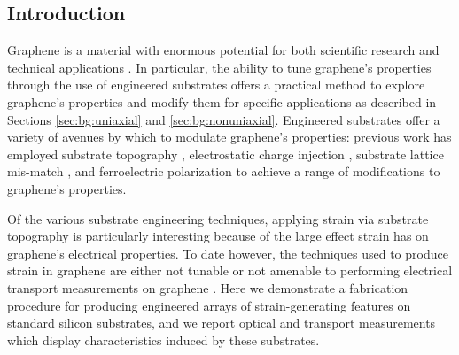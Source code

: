 \documentclass[edeposit,fullpage,draftthesis]{uiucthesis2009}
\begin{document}
            
    \subsection{Introduction}
    
            Graphene is a material with enormous potential for both scientific research and technical applications
            \cite{novoselov2004electric,novoselov2005two,zhang2005experimental,geim2007rise}.
            In particular, the ability to tune graphene's properties through the use of engineered substrates offers a practical
            method to explore graphene's properties and modify them for specific applications 
            \cite{guinea2010energy, zhou2007substrate} as described in Sections \ref{sec:bg:uniaxial} and \ref{sec:bg:nonuniaxial}.
            Engineered substrates offer a variety of avenues by which to modulate graphene's properties:
            previous work has employed substrate topography \cite{Tomori2011},
            electrostatic charge injection \cite{chiu2010controllable},
            substrate lattice mis-match \cite{zhou2007substrate},
            and ferroelectric polarization \cite{hinnefeld2016single}
            to achieve a range of modifications to graphene's properties.
             
            Of the various substrate engineering techniques, applying strain via substrate topography is particularly interesting
            because of the large effect strain has on graphene's electrical 
            properties\cite{guinea2010energy, pereira2009strain, levy2010strain}. 
            To date however, the techniques used to produce strain in graphene are either not tunable\cite{levy2010strain}
            or not amenable to performing electrical transport measurements on graphene
            \cite{Tomori2011, mohiuddin2009uniaxial, ni2008uniaxial, gill2015mechanical}.
            Here we demonstrate a fabrication procedure for producing engineered arrays of strain-generating features on standard silicon
            substrates, and we report optical and transport measurements which display characteristics induced by these substrates.
            
\end{document}
